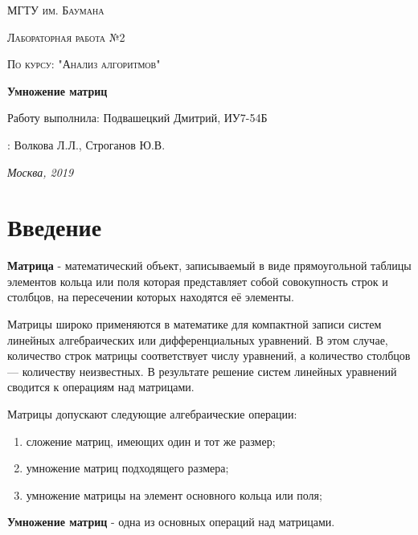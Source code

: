 \documentclass[12pt]{report}
\begin{document}
\begin{titlepage}
	\centering
	{\scshape\LARGE МГТУ им. Баумана \par}
	\vspace{3cm}
	{\scshape\Large Лабораторная работа №2\par}
	\vspace{0.5cm}	
	{\scshape\Large По курсу: "Анализ алгоритмов"\par}
	\vspace{1.5cm}
	{\huge\bfseries Умножение матриц\par}
	\vspace{2cm}
	\Large Работу выполнила: Подвашецкий Дмитрий, ИУ7-54Б\par
	\vspace{0.5cm}
	:  Волкова Л.Л., Строганов Ю.В.\par

	\vfill
	\large \textit {Москва, 2019} \par
\end{titlepage}

\tableofcontents

\newpage
\chapter*{Введение}

\textbf{Матрица} - математический объект, записываемый в виде прямоугольной таблицы элементов кольца или поля которая представляет собой совокупность строк и столбцов, на пересечении которых находятся её элементы.

Матрицы широко применяются в математике для компактной записи систем линейных алгебраических или дифференциальных уравнений. В этом случае, количество строк матрицы соответствует числу уравнений, а количество столбцов — количеству неизвестных. В результате решение систем линейных уравнений сводится к операциям над матрицами.

Матрицы допускают следующие алгебраические операции:
\begin{enumerate}
	\item сложение матриц, имеющих один и тот же размер;
	\item умножение матриц подходящего размера;
	\item умножение матрицы на элемент основного кольца или поля;
\end{enumerate}

\textbf{Умножение матриц} - одна из основных операций над матрицами.
\end{document}
